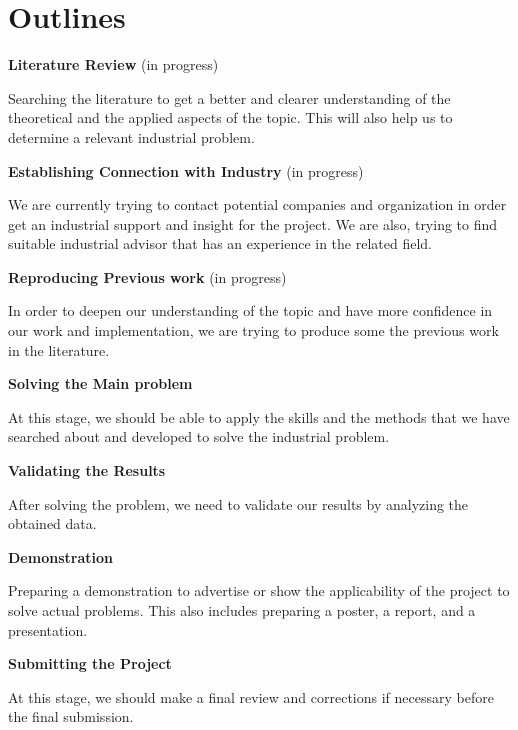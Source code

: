 \documentclass[a4paper, onecolumn, 12pt]{article}
\begin{document}
\newpage
\section*{Outlines}
\begin{itemize}
    {\item \textbf{Literature Review} {\footnotesize(in progress)}}

    Searching the literature to get a better and clearer understanding of the theoretical 
    and the applied aspects of the topic. This will also help us to determine a relevant industrial problem.

    {\item \textbf{Establishing Connection with Industry}
    {\footnotesize(in progress)}}

    We are currently trying to contact potential companies and organization in order get an industrial 
    support and insight for the project. We are also, trying to find suitable industrial advisor 
    that has an experience in the related field.

    {\item \textbf{Reproducing Previous work} {\footnotesize(in progress)}}

    In order to deepen our understanding of the topic and have more confidence in our work and implementation, 
    we are trying to produce some the previous work in the literature.

    {\item \textbf{Solving the Main problem }}
    
    At this stage, we should be able to apply the skills and the methods that 
    we have searched about and developed to solve the industrial problem.

     {\item \textbf{Validating the Results }}

     After solving the problem, we need to validate our results by analyzing the obtained data.

    {\item \textbf{Demonstration}} 

    Preparing a demonstration to advertise or show the applicability of the project to solve actual problems. 
    This also includes preparing a poster, a report, and a presentation.

    {\item \textbf{Submitting the Project}} 
    
    At this stage, we should make a final review and corrections if necessary before the final submission.
    
    
    
\end{itemize}

\newpage
\singlespacing


 
\end{document}
